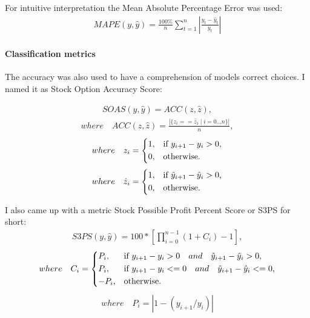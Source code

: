 \documentclass{article}
\begin{document}
For intuitive interpretation the Mean Absolute Percentage Error was used:
\begin{align}
{MAPE(y, \hat{y})={\frac {100\%}{n}}\sum _{t=1}^{n}\left|{\frac {y_{t}-\hat{y}_{t}}{y_{t}}}\right|}
\end{align}
\paragraph{Classification metrics}

The accuracy was also used to have a comprehension of models correct choices. I named it as Stock Option Accuracy Score:

\begin{align}
SOAS(y, \hat{y}) = ACC(z, \hat{z}),
\end{align}
\begin{align}
where \quad ACC(z, \hat{z}) = \frac{\left|\{z_i == \hat{z}_i \mid i = 0...n\}\right|}{n}, \nonumber 
\end{align}
 \begin{align}
    where \quad z_{i} = \begin{dcases*}
        1, & if $ y_{i+1} - y_{i} > 0 $,\\
        0, & otherwise. 
        \end{dcases*} \nonumber 
  \end{align}
 \begin{align}
    where \quad \hat{z}_{i} = \begin{dcases*}
        1, & if $ \hat{y}_{i+1} - \hat{y}_{i} > 0 $,\\
        0, & otherwise. 
        \end{dcases*} \nonumber 
  \end{align}


I also came up with a metric Stock Possible Profit Percent Score or S3PS for short:
\begin{align}
S3PS(y, \hat{y}) = 100 * [\prod_{i=0}^{n-1}{(1 + C_i)} - 1],
\end{align}
\begin{align}
where \quad C_i = \begin{dcases*}
        P_i, & if $ y_{i+1} - y_{i} > 0  \quad and \quad \hat{y}_{i+1} - \hat{y}_{i} > 0 $,\\
        P_i, & if $ y_{i+1} - y_{i} <= 0  \quad and \quad \hat{y}_{i+1} - \hat{y}_{i} <= 0 $,\\
        -P_i, & otherwise. 
        \end{dcases*} \nonumber 
\end{align}
\begin{align}
where \quad P_i = \left| 1 - (y_{i+1}/y_{i}) \right| \nonumber 
\end{align}
\end{document}
